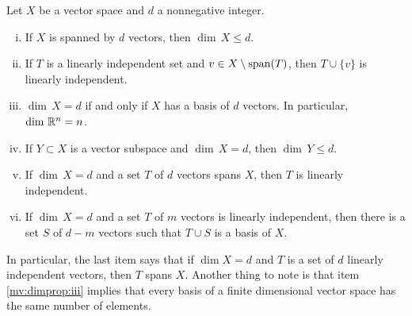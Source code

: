 \begin{prop} \label{mv:dimprop}
\pagebreak[2]
Let $X$ be a vector space and $d$ a nonnegative integer.
\begin{enumerate}[(i)]
\item \label{mv:dimprop:i}
If $X$ is spanned by $d$ vectors, then $\dim \, X \leq d$.
\item \label{mv:dimprop:ii}
If $T$ is a linearly independent set and
$v \in X \setminus \operatorname{span} (T)$, then
$T \cup \{ v \}$ is linearly independent.
\item \label{mv:dimprop:iii}
$\dim \, X = d$ if and only if $X$ has a basis of $d$
vectors.
In particular, $\dim \, {\mathbb{R}}^n = n$.
\item \label{mv:dimprop:iv}
If $Y \subset X$ is a vector subspace and $\dim \, X = d$,
then $\dim \, Y \leq d$.
\item \label{mv:dimprop:v}
If $\dim \, X = d$ and a set $T$ of $d$ vectors spans $X$,
then $T$ is linearly independent.
\item \label{mv:dimprop:vi}
If $\dim \, X = d$ and a set $T$ of $m$ vectors is
linearly independent, then there is a set $S$ of $d-m$
vectors such that $T \cup S$ is a basis of $X$.
\end{enumerate}
\end{prop}

In particular, the last item says that if $\dim X = d$ and $T$ is
a set of $d$ linearly independent vectors, then $T$ spans $X$.
Another thing to note is that item \ref{mv:dimprop:iii} implies that every
basis of a finite dimensional vector space has the same number of elements.

